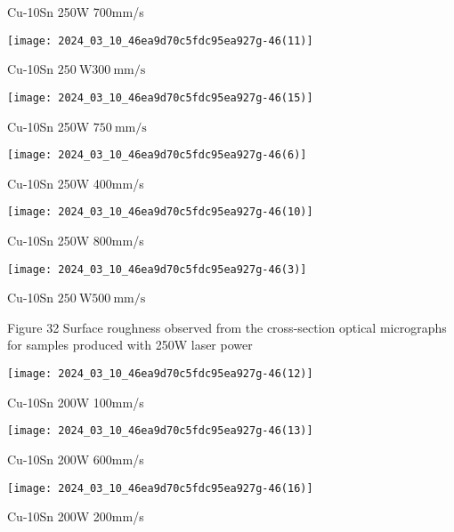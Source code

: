 \documentclass[10pt]{article}
\begin{document}
Cu-10Sn 250W 700mm/s

\begin{center}
\texttt{[image: 2024\_03\_10\_46ea9d70c5fdc95ea927g-46(11)]}
\end{center}

Cu-10Sn $250 \mathrm{~W} 300 \mathrm{~mm} / \mathrm{s}$

\begin{center}
\texttt{[image: 2024\_03\_10\_46ea9d70c5fdc95ea927g-46(15)]}
\end{center}

Cu-10Sn 250W $750 \mathrm{~mm} / \mathrm{s}$

\begin{center}
\texttt{[image: 2024\_03\_10\_46ea9d70c5fdc95ea927g-46(6)]}
\end{center}

Cu-10Sn 250W 400mm/s

\begin{center}
\texttt{[image: 2024\_03\_10\_46ea9d70c5fdc95ea927g-46(10)]}
\end{center}

Cu-10Sn 250W 800mm/s

\begin{center}
\texttt{[image: 2024\_03\_10\_46ea9d70c5fdc95ea927g-46(3)]}
\end{center}

Cu-10Sn $250 \mathrm{~W} 500 \mathrm{~mm} / \mathrm{s}$

Figure 32 Surface roughness observed from the cross-section optical micrographs for samples produced with 250W laser power

\begin{center}
\texttt{[image: 2024\_03\_10\_46ea9d70c5fdc95ea927g-46(12)]}
\end{center}

Cu-10Sn 200W 100mm/s

\begin{center}
\texttt{[image: 2024\_03\_10\_46ea9d70c5fdc95ea927g-46(13)]}
\end{center}

Cu-10Sn 200W 600mm/s

\begin{center}
\texttt{[image: 2024\_03\_10\_46ea9d70c5fdc95ea927g-46(16)]}
\end{center}

Cu-10Sn 200W 200mm/s
\end{document}
